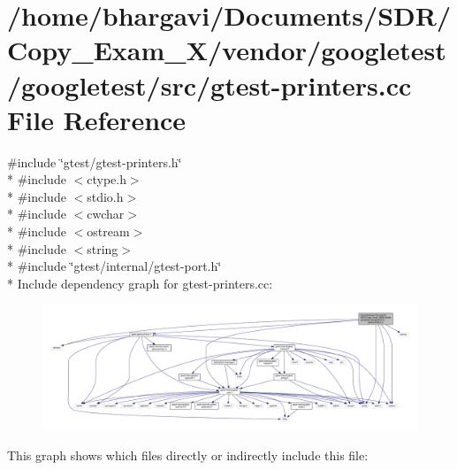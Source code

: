 \hypertarget{gtest-printers_8cc}{}\section{/home/bhargavi/\+Documents/\+S\+D\+R/\+Copy\+\_\+\+Exam\+\_\+X/vendor/googletest/googletest/src/gtest-\/printers.cc File Reference}
\label{gtest-printers_8cc}
{\ttfamily \#include \char`\"{}gtest/gtest-\/printers.\+h\char`\"{}}\\*
{\ttfamily \#include $<$ctype.\+h$>$}\\*
{\ttfamily \#include $<$stdio.\+h$>$}\\*
{\ttfamily \#include $<$cwchar$>$}\\*
{\ttfamily \#include $<$ostream$>$}\\*
{\ttfamily \#include $<$string$>$}\\*
{\ttfamily \#include \char`\"{}gtest/internal/gtest-\/port.\+h\char`\"{}}\\*
Include dependency graph for gtest-\/printers.cc\+:
\nopagebreak
\begin{figure}[H]
\begin{center}
\leavevmode
\includegraphics[width=350pt]{gtest-printers_8cc__incl}
\end{center}
\end{figure}
This graph shows which files directly or indirectly include this file\+:
\nopagebreak
